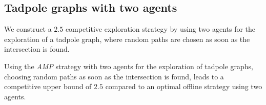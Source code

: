 \subsection{Tadpole graphs with two agents}\label{tadpole_two}

We construct a $2.5$ competitive exploration strategy by using two agents for the exploration of a tadpole graph, where random paths are chosen as soon as the intersection is found.


    \begin{theorem}\label{TadpoleUpperTwo}
        Using the \textit{AMP} strategy with two agents for the exploration of tadpole graphs, choosing random paths as soon as the intersection is found,
        leads to a competitive upper bound of $2.5$ compared to an optimal offline strategy using two agents.
    \end{theorem}
    

